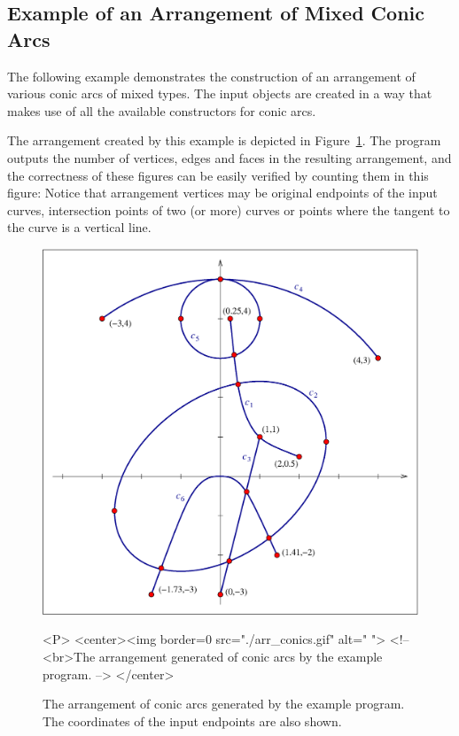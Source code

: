 
\subsection{Example of an Arrangement of Mixed Conic Arcs}
\label{ssec:example13}

The following example demonstrates the construction of an arrangement
of various conic arcs of mixed types. The input  objects are
created in a way that makes use of all the available constructors for conic
arcs.

The arrangement created  by this example is depicted in 
Figure~\ref{fig:conics}. The program outputs the number of vertices, edges and
faces in the resulting arrangement, and the correctness of these figures can
be easily verified by counting them in this figure: Notice that arrangement
vertices may be original endpoints of the input curves, intersection points
of two (or more) curves or points where the tangent to the curve is a vertical
line.

\begin{figure}[h]
\begin{ccTexOnly}
{\centering \resizebox*{0.6\textheight}{0.4\textheight}%
{\includegraphics{arr_conics.ps}}}
\end{ccTexOnly}
\caption{The arrangement of conic arcs generated by the example program.
The coordinates of the input endpoints are also shown.
\label{fig:conics}}
\begin{ccHtmlOnly}
<P>
<center><img border=0 src="./arr_conics.gif" alt=" ">
<!-- <br>The arrangement generated of conic arcs by the example program. -->
</center>
\end{ccHtmlOnly}
\end{figure}

